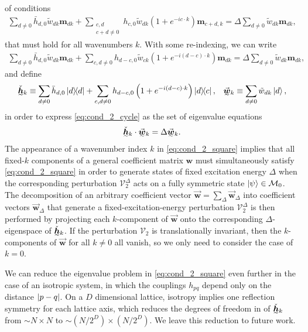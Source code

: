 \documentclass[nofootinbib,notitlepage,11pt]{revtex4-2}
\newcommand{\p}[1]{\left(#1\right)} %
\renewcommand{\c}{\cdot} %
\newcommand{\m}{\bm} %
\renewcommand{\v}{\vec} %
\newcommand{\1}{\mathds{1}}
\newcommand{\M}{\mathcal{M}}
\newcommand{\V}{\mathcal{V}}
\newcommand{\ut}{\undertilde}
\begin{document}
of conditions
\begin{align}
  \sum_{d\ne0} \bar h_{d,0} \tilde w_{dk} \m m_{dk}
  + \sum_{\substack{c,d\\c+d\ne0}}
  h_{c,0} \tilde w_{dk} \p{1 + e^{-ic\c k}} \m m_{c+d,k}
  = \Delta \sum_{d\ne0} \tilde w_{dk} \m m_{dk},
\end{align}
that must hold for all wavenumbers $k$.  With some re-indexing, we can
write
\begin{align}
  \sum_{d\ne0} \bar h_{d,0} \tilde w_{dk} \m m_{dk}
  + \sum_{c,d\ne0} h_{d-c,0} \tilde w_{ck}
  \p{1 + e^{-i\p{d-c}\c k}} \m m_{dk}
  = \Delta \sum_{d\ne0} \tilde w_{dk} \m m_{dk},
  \label{eq:cond_2_cycle}
\end{align}
and define
\begin{align}
  \ut{\check{\m h}}_k
  \equiv \sum_{d\ne0} \bar h_{d,0} \op{d}
  + \sum_{c,d\ne0} h_{d-c,0} \p{1+e^{-i\p{d-c}\c k}} \op{d}{c},
  &&
  \ut{\v{\m w}}_k \equiv \sum_{d\ne0} \tilde w_{dk} \ket{d},
  \label{eq:cycle_vecs}
\end{align}
in order to express \eqref{eq:cond_2_cycle} as the set of eigenvalue
equations
\begin{align}
  \ut{\check{\m h}}_k \c \ut{\v{\m w}}_k = \Delta \ut{\v{\m w}}_k.
  \label{eq:cond_2_square}
\end{align}
The appearance of a wavenumber index $k$ in \eqref{eq:cond_2_square}
implies that all fixed-$k$ components of a general coefficient matrix
$\m w$ must simultaneously satisfy \eqref{eq:cond_2_square} in order
to generate states of fixed excitation energy $\Delta$ when the
corresponding perturbation $\V_2^\Delta$ acts on a fully symmetric
state $\ket\psi\in\M_0$.  The decomposition of an arbitrary
coefficient vector $\v{\m w}=\sum_\Delta\v{\m w}_\Delta$ into
coefficient vectors $\v{\m w}_\Delta$ that generate a
fixed-excitation-energy perturbation $\V_2^\Delta$ is then performed
by projecting each $k$-component of $\v{\m w}$ onto the corresponding
$\Delta$-eigenspace of $\ut{\check{\m h}}_k$.  If the perturbation
$\V_2$ is translationally invariant, then the $k$-components of
$\v{\m w}$ for all $k\ne 0$ all vanish, so we only need to consider
the case of $k=0$.

We can reduce the eigenvalue problem in \eqref{eq:cond_2_square} even
further in the case of an isotropic system, in which the couplings
$h_{pq}$ depend only on the distance $\abs{p-q}$.  On a $D$
dimensional lattice, isotropy implies one reflection symmetry for each
lattice axis, which reduces the degrees of freedom in of
$\ut{\check{\m h}}_k$ from $\sim N\times N$ to
$\sim\p{N/2^D}\times\p{N/2^D}$.  We leave this reduction to future
work.
\end{document}
